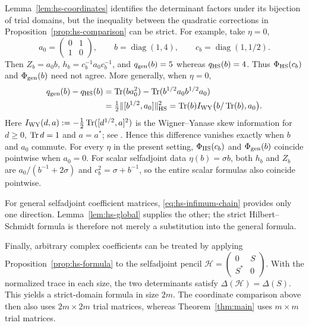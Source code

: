 \begin{remark}\label{rem:hs-objectives}
Lemma~\ref{lem:hs-coordinates} identifies the determinant factors under its bijection of trial domains, but the inequality between the quadratic corrections in Proposition~\ref{prop:hs-comparison} can be strict.
For example, take $\eta=0$,
\[
 a_0=\begin{pmatrix}0&1\\1&0\end{pmatrix},\qquad
 b=\operatorname{diag}(1,4),\qquad
 c_b=\operatorname{diag}(1,1/2).
\]
Then $Z_b=a_0b$, $h_b=c_b^{-1}a_0c_b^{-1}$, and $q_{\rm gen}(b)=5$ whereas $q_{\rm HS}(b)=4$.
Thus $\Phi_{\rm HS}(c_b)$ and $\Phi_{\rm gen}(b)$ need not agree.
More generally, when $\eta=0$,
\[
 \begin{split}
 q_{\rm gen}(b)-q_{\rm HS}(b)
 &=\operatorname{Tr}(ba_0^2)-\operatorname{Tr}(b^{1/2}a_0b^{1/2}a_0)\\
 &=\tfrac12\|[b^{1/2},a_0]\|_{\rm HS}^2
 =\operatorname{Tr}(b)I_{\rm WY}\bigl(b/\operatorname{Tr}(b),a_0\bigr).
 \end{split}
\]
Here $I_{\rm WY}(d,a):=-\tfrac12\operatorname{Tr}([d^{1/2},a]^2)$ is the Wigner--Yanase skew information for $d\ge0$, $\operatorname{Tr} d=1$ and $a=a^*$; see \cite{Han08}.
Hence this difference vanishes exactly when $b$ and $a_0$ commute.
For every $\eta$ in the present setting, $\Phi_{\rm HS}(c_b)$ and $\Phi_{\rm gen}(b)$ coincide pointwise when $a_0=0$.
For scalar selfadjoint data $\eta(b)=\sigma b$, both $h_b$ and $Z_b$ are $a_0/(b^{-1}+2\sigma)$ and $c_b^2=\sigma+b^{-1}$, so the entire scalar formulas also coincide pointwise.

For general selfadjoint coefficient matrices, \eqref{eq:hs-infimum-chain} provides only one direction.
Lemma~\ref{lem:hs-global} supplies the other; the strict Hilbert--Schmidt formula is therefore not merely a substitution into the general formula.
\end{remark}

Finally, arbitrary complex coefficients can be treated by applying Proposition~\ref{prop:hs-formula} to the selfadjoint pencil $\mathscr H=\left(\begin{smallmatrix}0&S\\S^*&0\end{smallmatrix}\right)$.
With the normalized trace in each size, the two determinants satisfy $\Delta(\mathscr H)=\Delta(S)$.
This yields a strict-domain formula in size $2m$.
The coordinate comparison above then also uses $2m\times2m$ trial matrices, whereas Theorem~\ref{thm:main} uses $m\times m$ trial matrices.
